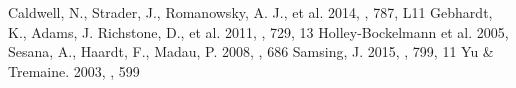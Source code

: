 \documentclass{aastex62}
\begin{document}
\begin{thebibliography}{}
Caldwell, N., Strader, J., Romanowsky, A. J., et al. 2014, \apjl, 787, L11
Gebhardt, K., Adams, J. Richstone, D., et al. 2011, \apj, 729, 13
Holley-Bockelmann et al. 2005, \apjl
{}
Sesana, A., Haardt, F., Madau, P. 2008, \apj, 686
Samsing, J. 2015, \apj, 799, 11
Yu \& Tremaine. 2003, \apj, 599
\end{thebibliography}
\end{document}
